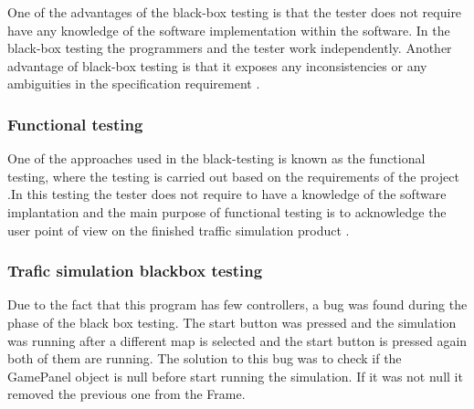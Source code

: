 One of the advantages of the black-box testing is that the tester does not require have any knowledge of the software implementation within the software. In the black-box testing the programmers and the tester work independently. Another advantage of black-box testing is that it exposes any inconsistencies or any ambiguities in the specification requirement \cite{boris}. \newline
 
 \subsubsection{Functional testing }

One of the approaches used in the black-testing is known as the functional testing, where the testing is carried out based on the requirements of the project .In this testing the tester does not require to have a knowledge of the software implantation and the main purpose of functional testing is to acknowledge the user point of view on the finished traffic simulation product \cite{mauro}.


\subsubsection{Trafic simulation blackbox testing}

Due to the fact that this program has few controllers, a bug was found during the phase of the black box testing. The start button was pressed and the simulation was running after a different map is selected and the start button is pressed again both of them are running. The solution to this bug was to check if the GamePanel object is null before start running the simulation. If it was not null it removed the previous one from the Frame.









